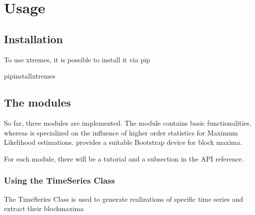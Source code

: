 \documentclass[a4paper,11pt,openany,english]{sphinxmanual}
\begin{document}
\chapter{Usage}
\label{\detokenize{usage:usage}}\label{\detokenize{usage::doc}}

\section{Installation}
\label{\detokenize{usage:installation}}\label{\detokenize{usage:id1}}
\sphinxAtStartPar
To use xtremes, it is possible to install it via pip

\begin{sphinxVerbatim}[commandchars=\\\{\}]
 pipinstallxtremes
\end{sphinxVerbatim}


\section{The modules}
\label{\detokenize{usage:the-modules}}
\sphinxAtStartPar
So far, three modules are implemented. The module  contains basic functionalities,
whereas  is specialized on the influence of higher order statistics for
Maximum Likelihood estimations.  provides a suitable Bootstrap device
for block maxima.

\sphinxAtStartPar
For each module, there will be a tutorial and a subsection in the API reference.

\sphinxstepscope


\subsection{Using the TimeSeries Class}
\label{\detokenize{notebooks/timeseries:Using-the-TimeSeries-Class}}\label{\detokenize{notebooks/timeseries::doc}}
\sphinxAtStartPar
The TimeSeries Class is used to generate realizations of specific time series and extract their blockmaxima
\end{document}
